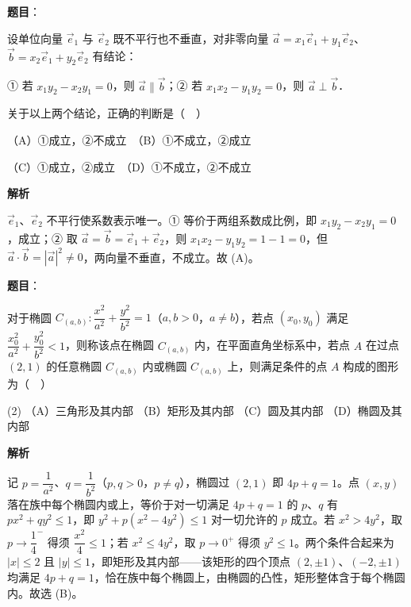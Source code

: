 \begin{answer}

\textbf{题目}：

设单位向量 \(\vec{e}_{1}\) 与 \(\vec{e}_{2}\) 既不平行也不垂直，对非零向量 \(\vec{a}=x_{1}\vec{e}_{1}+y_{1}\vec{e}_{2}\)、\(\vec{b}=x_{2}\vec{e}_{1}+y_{2}\vec{e}_{2}\) 有结论：

① 若 \(x_{1}y_{2}-x_{2}y_{1}=0\)，则 \(\vec{a}\parallel\vec{b}\)；② 若 \(x_{1}x_{2}-y_{1}y_{2}=0\)，则 \(\vec{a}\perp\vec{b}\)．

关于以上两个结论，正确的判断是（　）

（A）①成立，②不成立　（B）①不成立，②成立

（C）①成立，②成立　（D）①不成立，②不成立

\textbf{解析}

\(\vec{e}_{1}\)、\(\vec{e}_{2}\) 不平行使系数表示唯一。① 等价于两组系数成比例，即 \(x_{1}y_{2}-x_{2}y_{1}=0\)，成立；② 取 \(\vec{a}=\vec{b}=\vec{e}_{1}+\vec{e}_{2}\)，则 \(x_{1}x_{2}-y_{1}y_{2}=1-1=0\)，但 \(\vec{a}\cdot\vec{b}=|\vec{a}|^{2}\neq 0\)，两向量不垂直，不成立。故 (A)。


\end{answer}
\begin{answer}

\textbf{题目}：

对于椭圆 \(C_{(a,b)}:\dfrac{x^{2}}{a^{2}}+\dfrac{y^{2}}{b^{2}}=1\)（\(a,b>0\)，\(a\neq b\)），若点 \((x_{0},y_{0})\) 满足 \(\dfrac{x_{0}^{2}}{a^{2}}+\dfrac{y_{0}^{2}}{b^{2}}<1\)，则称该点在椭圆 \(C_{(a,b)}\) 内，在平面直角坐标系中，若点 \(A\) 在过点 \((2,1)\) 的任意椭圆 \(C_{(a,b)}\) 内或椭圆 \(C_{(a,b)}\) 上，则满足条件的点 \(A\) 构成的图形为（　）

\begin{gkopts}(2)
\task （A）三角形及其内部
\task （B）矩形及其内部
\task （C）圆及其内部
\task （D）椭圆及其内部
\end{gkopts}

\textbf{解析}

记 \(p=\dfrac{1}{a^{2}}\)、\(q=\dfrac{1}{b^{2}}\)（\(p,q>0\)，\(p\neq q\)），椭圆过 \((2,1)\) 即 \(4p+q=1\)。点 \((x,y)\) 落在族中每个椭圆内或上，等价于对一切满足 \(4p+q=1\) 的 \(p\)、\(q\) 有 \(px^{2}+qy^{2}\leqslant 1\)，即 \(y^{2}+p(x^{2}-4y^{2})\leqslant 1\) 对一切允许的 \(p\) 成立。若 \(x^{2}>4y^{2}\)，取 \(p\to\dfrac{1}{4}^{-}\) 得须 \(\dfrac{x^{2}}{4}\leqslant 1\)；若 \(x^{2}\leqslant 4y^{2}\)，取 \(p\to 0^{+}\) 得须 \(y^{2}\leqslant 1\)。两个条件合起来为 \(|x|\leqslant 2\) 且 \(|y|\leqslant 1\)，即矩形及其内部——该矩形的四个顶点 \((2,\pm 1)\)、\((-2,\pm 1)\) 均满足 \(4p+q=1\)，恰在族中每个椭圆上，由椭圆的凸性，矩形整体含于每个椭圆内。故选 (B)。


\end{answer}
